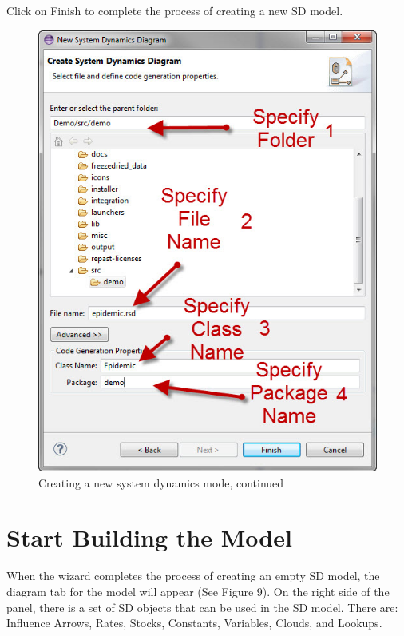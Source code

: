 \documentclass[11pt]{amsart}
\begin{document}
Click on Finish to complete the process of creating a new SD model.



\begin{figure}[ht]
\begin{center}
\vspace{.2in}
\centerline {
\includegraphics[totalheight=0.35\textheight]{images/008.jpg}
}
\caption{Creating a new system dynamics mode, continued}
\label{fig:008}
\end{center}
\end{figure}

\clearpage

\section{Start Building the Model}
When the wizard completes the process of creating an empty SD model, the diagram tab for the model will appear (See Figure 9). On the right side of the panel, there is a set of SD objects that can be used in the SD model. There are: Influence Arrows, Rates, Stocks, Constants, Variables, Clouds, and Lookups.
\end{document}
